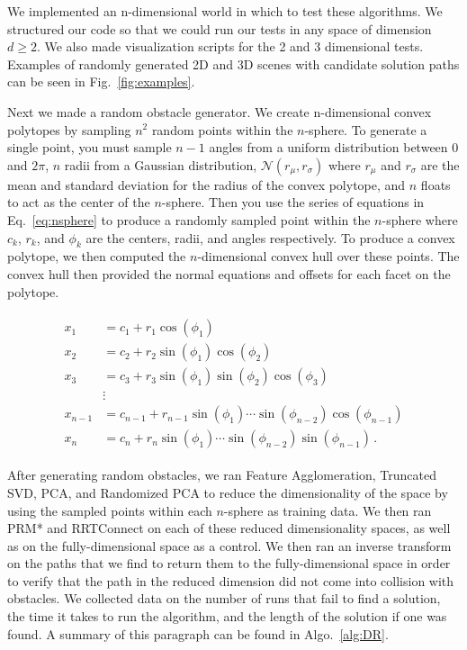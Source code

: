 \documentclass[12pt]{article}
\begin{document}
We implemented an n-dimensional world in which to test these algorithms. We
structured our code so that we could run our tests in any space of dimension $d
\geq 2$. We also made visualization scripts for the 2 and 3 dimensional tests.
Examples of randomly generated 2D and 3D scenes with candidate solution paths
can be seen in Fig.~\ref{fig:examples}.

Next we made a random obstacle generator. We create n-dimensional convex
polytopes by sampling $n^{2}$ random points within the $n$-sphere. To generate
a single point, you must sample $n - 1$ angles from a uniform distribution
between 0 and $2\pi$, $n$ radii from a Gaussian distribution,
$\mathcal{N}(r_{\mu}, r_{\sigma})$ where $r_{\mu}$ and $r_{\sigma}$ are the
mean and standard deviation for the radius of the convex polytope, and $n$
floats to act as the center of the $n$-sphere.  Then you use the series of
equations in Eq.~\ref{eq:nsphere} to produce a randomly sampled point within
the $n$-sphere where $c_k$, $r_k$, and $\phi_k$ are the centers, radii, and
angles respectively.  To produce a convex polytope, we then computed the
$n$-dimensional convex hull over these points. The convex hull then provided
the normal equations and offsets for each facet on the polytope.

\begin{align}
    \begin{split}
        x_1 &= c_1 + r_1 \cos(\phi_1) \\
        x_2 &= c_2 + r_2 \sin(\phi_1) \cos(\phi_2) \\
        x_3 &= c_3 + r_3 \sin(\phi_1) \sin(\phi_2) \cos(\phi_3) \\
            &\vdots\\
        x_{n-1} &= c_{n - 1} + r_{n - 1} \sin(\phi_1) \cdots \sin(\phi_{n-2}) \cos(\phi_{n-1}) \\
        x_n &= c_n + r_{n} \sin(\phi_1) \cdots \sin(\phi_{n-2}) \sin(\phi_{n-1}) \,.
    \end{split}
    \label{eq:nsphere}
\end{align}

After generating random obstacles, we ran Feature Agglomeration, Truncated SVD,
PCA, and Randomized PCA to reduce the dimensionality of the space by using the
sampled points within each $n$-sphere as training data. We then ran PRM* and
RRTConnect on each of these reduced dimensionality spaces, as well as on the
fully-dimensional space as a control. We then ran an inverse transform on the
paths that we find to return them to the fully-dimensional space in order to
verify that the path in the reduced dimension did not come into collision with
obstacles. We collected data on the number of runs that fail to find a
solution, the time it takes to run the algorithm, and the length of the
solution if one was found.  A summary of this paragraph can be found in
Algo.~\ref{alg:DR}.
\end{document}
